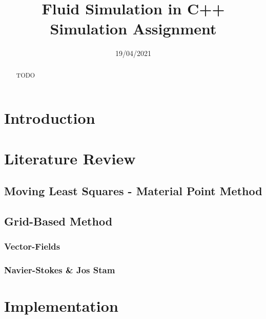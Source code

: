 \documentclass[notitlepage,12pt]{article}
\title{%
Fluid Simulation in C++ \\
\large Simulation Assignment}
\author{}
\date{19/04/2021}
\begin{document}
\maketitle

\thispagestyle{empty}

\begin{abstract}
\noindent TODO
\end{abstract}

\newpage
\clearpage
\setcounter{page}{1}

\section{Introduction}

\section{Literature Review}

\subsection{Moving Least Squares - Material Point Method}


\subsection{Grid-Based Method}

\subsubsection{Vector-Fields}


\subsubsection{Navier-Stokes \& Jos Stam}


\section{Implementation}
\end{document}
